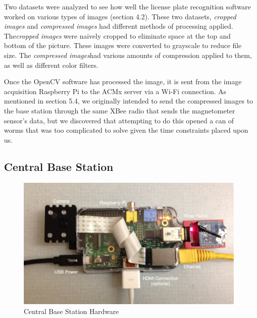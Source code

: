 \documentclass[11pt, oneside, fullpage, doublespace]{article}
\begin{document}
Two datasets were analyzed to see how well the license plate recognition software worked on various types of images (section 4.2). These two datasets, \emph{cropped images} and \emph{compressed images} had different methods of processing applied. The\emph{cropped images} were naively cropped to eliminate space at the top and bottom of the picture. These images were converted to grayscale to reduce file size. The \emph{compressed images}had various amounts of compression applied to them, as well as different color filters.

Once the OpenCV software has processed the image, it is sent from the image acquisition Raspberry Pi to the ACMx server via a Wi-Fi connection. As mentioned in section 5.4, we originally intended to send the compressed images to the base station through the same XBee radio that sends the magnetometer sensor's data, but we discovered that attempting to do this opened a can of worms that was too complicated to solve given the time constraints placed upon us.

\subsection{Central Base Station}
\begin{figure}
\begin{center}
\includegraphics[width=4.5in]{basestation}
\end{center}
\caption{Central Base Station Hardware}
\label{fig:basestation}
\end{figure}
\end{document}
